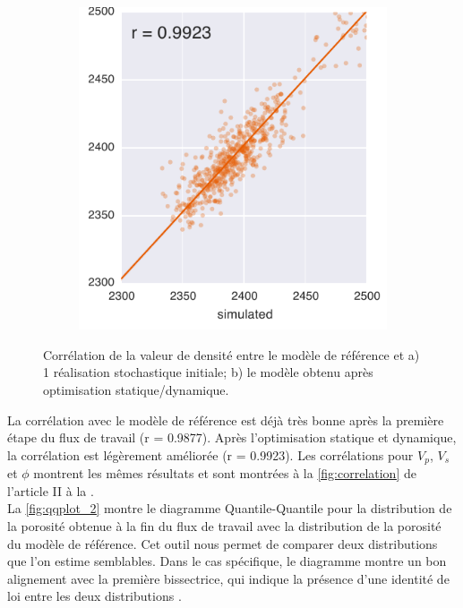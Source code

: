 \begin{figure}[!ht]
\begin{subfigure}[b]{0.4\textwidth}
                \includegraphics[width=\textwidth]{fig/corr_b.pdf}
                \label{fig:corr_b}
        \end{subfigure}
        \caption{Corrélation de la valeur de densité entre le modèle de
référence et a) 1 réalisation stochastique initiale; b) le modèle obtenu après
optimisation statique/dynamique.}
        \label{fig:corr_rho}
\end{figure}
La corrélation avec le modèle de référence est déjà très bonne après la première
étape du flux de travail (r = \num{0.9877}). Après l'optimisation statique et
dynamique, la corrélation est légèrement améliorée (r = \num{0.9923}). Les
corrélations pour $V_p$, $V_s$ et $\phi$ montrent les mêmes résultats et sont
montrées à la \cref{fig:correlation} de l'article II à la
.\\
La \cref{fig:qqplot_2} montre le diagramme Quantile-Quantile pour la
distribution de la porosité obtenue à la fin du flux de travail avec la
distribution de la porosité du modèle de référence. Cet outil nous permet de
comparer deux distributions que l'on estime semblables. Dans le cas spécifique,
le diagramme montre un bon alignement avec la première bissectrice, qui indique
la présence d'une identité de loi entre les deux distributions
\citep{Dagnelie2011}.
